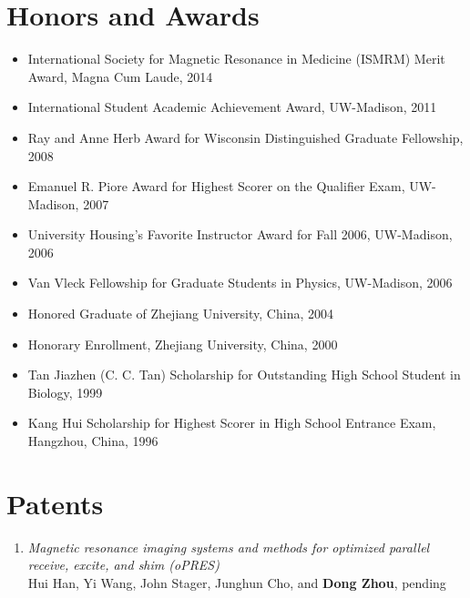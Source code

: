 \documentclass[centered,11pt,overlapped]{res}
\begin{document}
\begin{resume}
\section{\sc Honors and Awards}
\begin{itemize}[leftmargin=-0.1in]
\item International Society for Magnetic Resonance in Medicine (ISMRM) Merit Award, Magna Cum Laude, 2014
\item International Student Academic Achievement Award, UW-Madison, 2011
\item Ray and Anne Herb Award for Wisconsin Distinguished Graduate Fellowship, 2008
\item Emanuel R. Piore Award for Highest Scorer on the Qualifier Exam, UW-Madison, 2007
\item University Housing's Favorite Instructor Award for Fall 2006, UW-Madison, 2006
\item Van Vleck Fellowship for Graduate Students in Physics, UW-Madison, 2006
\item Honored Graduate of Zhejiang University, China, 2004
\item Honorary Enrollment, Zhejiang University, China, 2000
\item Tan Jiazhen (C. C. Tan) Scholarship for Outstanding High School Student in Biology, 1999
\item Kang Hui Scholarship for Highest Scorer in High School Entrance Exam, Hangzhou, China, 1996
\end{itemize}


\section{\sc Patents}
\begin{enumerate}[leftmargin=-0.1in]
\item {\em Magnetic resonance imaging systems and methods for optimized parallel receive, excite, and shim (oPRES) } \\
Hui Han, Yi Wang, John Stager, Junghun Cho, and {\bf Dong Zhou}, pending
\end{enumerate}

\end{resume}
\end{document}
